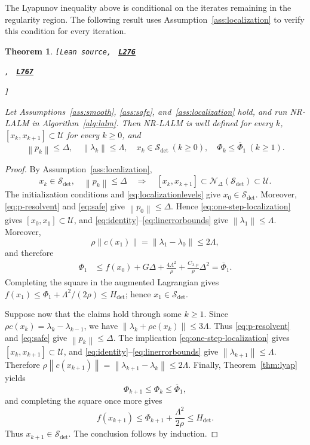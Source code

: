 \documentclass[11pt]{article}
\newtheorem{theorem}{Theorem}[section]
\theoremstyle{definition}
\theoremstyle{remark}
\numberwithin{equation}{section}
\numberwithin{figure}{section}
\numberwithin{table}{section}
\numberwithin{algorithm}{section}
\newcommand{\norm}[1]{\left\lVert #1\right\rVert}
\newcommand{\leanLinkText}[1]{%
  \underline{\textbf{#1}}%
}
\newcommand{\leanDeclTag}[2]{%
  {\footnotesize\texttt{[Lean source, }}%
  \href{https://github.com/optpku/ReasBook/blob/v4.32.2/ReasBook/Papers/TR_LALM_theory/#1?plain=1\#L#2}%
    {\leanLinkText{\footnotesize\texttt{L#2}}}%
}
\newcommand{\leanDeclTagExtra}[2]{%
  \unskip
  {\footnotesize\texttt{, }}%
  \href{https://github.com/optpku/ReasBook/blob/v4.32.2/ReasBook/Papers/TR_LALM_theory/#1?plain=1\#L#2}%
    {\leanLinkText{\footnotesize\texttt{L#2}}}\allowbreak
}
\newcommand{\leanDeclTagEnd}{%
  \unskip
  {\footnotesize\texttt{]}}\enspace
}
\begin{document}
The Lyapunov inequality above is conditional on the iterates remaining in the regularity region. The following result uses Assumption~\ref{ass:localization} to verify this condition for every iteration.

\begin{theorem}
\label{thm:localization}
\leanDeclTag{Theorem_2_10.lean}{276}
\leanDeclTagExtra{Theorem_2_10.lean}{767}
\leanDeclTagEnd
Let Assumptions~\ref{ass:smooth}, \ref{ass:safe}, and~\ref{ass:localization}
hold, and run NR-LALM in Algorithm~\ref{alg:lalm}.  Then NR-LALM is
well defined for every $k$, $[x_k,x_{k+1}]\subset\mathcal U$ for every $k\ge0$,
and
\begin{equation}
    \norm{p_k}\le\Delta,\quad
    \norm{\lambda_k}\le\Lambda,\quad
    x_k\in\mathcal S_{\mathrm{det}}\ (k\ge0),\quad
    \Phi_k\le\overline\Phi_1\ (k\ge1).
    \label{eq:localizedbounds}
\end{equation}
\end{theorem}

\begin{proof}
By Assumption~\ref{ass:localization},
\begin{equation}
    x_k\in\mathcal S_{\mathrm{det}},
    \quad
    \norm{p_k}\leq\Delta
    \quad\Longrightarrow\quad
    [x_k,x_{k+1}]
    \subset
    \mathcal N_\Delta(\mathcal S_{\mathrm{det}})
    \subset\mathcal U.
    \label{eq:one-step-localization}
\end{equation}
The initialization conditions and \eqref{eq:localizationlevels} give
$x_0\in\mathcal S_{\mathrm{det}}$.  Moreover,
\eqref{eq:p-resolvent} and \eqref{eq:safe} give
$\norm{p_0}\leq\Delta$. Hence \eqref{eq:one-step-localization}
gives $[x_0,x_1]\subset\mathcal U$, and
\eqref{eq:identity}--\eqref{eq:linerrorbounds} give
$\norm{\lambda_1}\leq\Lambda$.  Moreover,
$$
    \rho\norm{c(x_1)}
    =
    \norm{\lambda_1-\lambda_0}
    \leq2\Lambda,
$$
and therefore
\begin{align*}
\Phi_1
&\leq
f(x_0)+G\Delta
+\frac{4\Lambda^2}{\rho}
+\frac{C_{\lambda,p}}{\rho}\Delta^2
=
\overline\Phi_1.
\end{align*}
Completing the square in the augmented Lagrangian gives
$f(x_1) \leq \Phi_1+\Lambda^2/(2\rho) \leq H_{\mathrm{det}}$;
hence $x_1\in\mathcal S_{\mathrm{det}}$.

Suppose now that the claims hold through some $k\geq1$.  Since
$\rho c(x_k)=\lambda_k-\lambda_{k-1}$, we have
$\norm{\lambda_k+\rho c(x_k)} \leq3\Lambda$.
Thus \eqref{eq:p-resolvent} and \eqref{eq:safe} give
$\norm{p_k}\leq\Delta$. The implication
\eqref{eq:one-step-localization} gives $[x_k,x_{k+1}]\subset\mathcal U$,
and \eqref{eq:identity}--\eqref{eq:linerrorbounds} give
$\norm{\lambda_{k+1}}\leq\Lambda$.  Therefore
$\rho\norm{c(x_{k+1})}
=\norm{\lambda_{k+1}-\lambda_k}\le2\Lambda$.  Finally,
Theorem~\ref{thm:lyap} yields
$$
    \Phi_{k+1}\leq\Phi_k\leq\overline\Phi_1,
$$
and completing the square once more gives
$$
    f(x_{k+1})
    \leq
    \Phi_{k+1}+\frac{\Lambda^2}{2\rho}
    \leq
    H_{\mathrm{det}}.
$$
Thus $x_{k+1}\in\mathcal S_{\mathrm{det}}$.
The conclusion follows by induction.
\end{proof}
\end{document}

